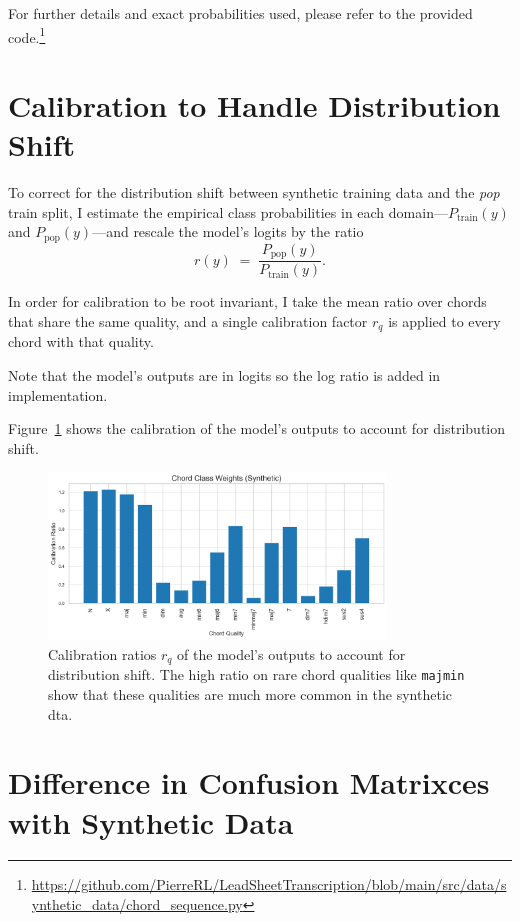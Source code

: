 For further details and exact probabilities used, please refer to the provided code.\footnote{\url{https://github.com/PierreRL/LeadSheetTranscription/blob/main/src/data/synthetic_data/chord_sequence.py}}

\section{Calibration to Handle Distribution Shift}\label{app:calibration}

To correct for the distribution shift between synthetic training data and the \emph{pop} train split, I estimate the empirical class probabilities in each domain---\(P_{\text{train}}(y)\) and \(P_{\text{pop}}(y)\)---and rescale the model’s logits by the ratio
\begin{equation}
r(y)\;=\;\frac{P_{\text{pop}}(y)}{P_{\text{train}}(y)}.
\end{equation}

In order for calibration to be root invariant, I take the mean ratio over chords that share the same quality, and a single calibration factor \(r_q\) is applied to every chord with that quality.

Note that the model's outputs are in logits so the log ratio is added in implementation.

Figure~\ref{fig:calibration} shows the calibration of the model's outputs to account for distribution shift.

\begin{figure}[H]
    \centering
    \includegraphics[width=0.8\textwidth]{figures/calibration_ratios.png}
    \caption{Calibration ratios $r_q$ of the model's outputs to account for distribution shift. The high ratio on rare chord qualities like \texttt{majmin} show that these qualities are much more common in the synthetic dta.}\label{fig:calibration}
\end{figure}

\section{Difference in Confusion Matrixces with Synthetic Data}\label{app:cm_synthetic_data}

